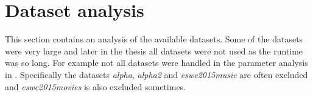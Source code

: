 

\section{Dataset analysis}\label{sec:results:data}

This section contains an analysis of the available datasets. Some of the datasets were very large and later in the thesis all datasets were not used as the runtime was so long. For example not all datasets were handled in the parameter analysis in . Specifically the datasets \textit{alpha}, \textit{alpha2} and \textit{eswc2015music} are often excluded and \textit{eswc2015movies} is also excluded sometimes.






